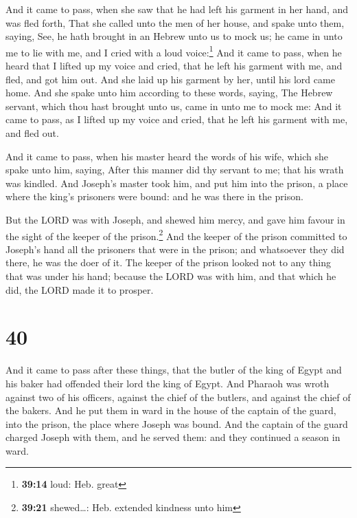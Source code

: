  And it came to pass, when she saw that he had left his
garment in her hand, and was fled forth,  That she called
unto the men of her house, and spake unto them, saying, See, he hath
brought in an Hebrew unto us to mock us; he came in unto me to lie with
me, and I cried with a loud voice:\footnote{\textbf{39:14} loud: Heb.
  great}  And it came to pass, when he heard that I
lifted up my voice and cried, that he left his garment with me, and
fled, and got him out.  And she laid up his garment by
her, until his lord came home.  And she spake unto him
according to these words, saying, The Hebrew servant, which thou hast
brought unto us, came in unto me to mock me:  And it came
to pass, as I lifted up my voice and cried, that he left his garment
with me, and fled out.

 And it came to pass, when his master heard the words of
his wife, which she spake unto him, saying, After this manner did thy
servant to me; that his wrath was kindled.  And Joseph's
master took him, and put him into the prison, a place where the king's
prisoners were bound: and he was there in the prison.

 But the LORD was with Joseph, and shewed him mercy, and
gave him favour in the sight of the keeper of the prison.\footnote{\textbf{39:21}
  shewed\ldots: Heb. extended kindness unto him}  And the
keeper of the prison committed to Joseph's hand all the prisoners that
were in the prison; and whatsoever they did there, he was the doer of
it.  The keeper of the prison looked not to any thing
that was under his hand; because the LORD was with him, and that which
he did, the LORD made it to prosper.

\hypertarget{section-39}{%
\section{40}\label{section-39}}

 And it came to pass after these things, that the butler
of the king of Egypt and his baker had offended their lord the king of
Egypt.  And Pharaoh was wroth against two of his officers,
against the chief of the butlers, and against the chief of the bakers.
 And he put them in ward in the house of the captain of
the guard, into the prison, the place where Joseph was bound.
 And the captain of the guard charged Joseph with them,
and he served them: and they continued a season in ward.

